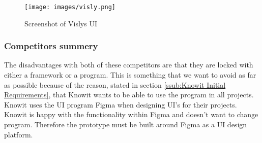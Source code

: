 \begin{figure}[H]
  \centering
  \texttt{[image: images/visly.png]}
  \caption{ Screenshot of Vislys UI }%
  \label{fig:visly}
\end{figure}





\subsubsection{Competitors summery}%
\label{ssub:Comparison}

The disadvantages with both of these competitors are that they are locked with either a framework or a program. This is something that we want to avoid as far as possible because of the reason, stated in section \ref{ssub:Knowit Initial Requirements}, that Knowit wants to be able to use the program in all projects. Knowit uses the UI program Figma when designing UI's for their projects. Knowit is happy with the functionality within Figma and doesn't want to change program. Therefore the prototype must be built around Figma as a UI design platform.





